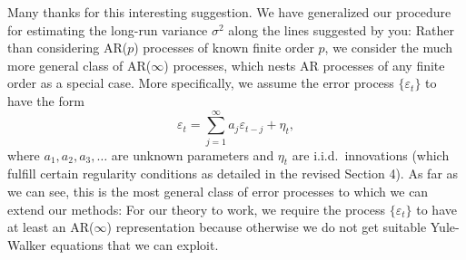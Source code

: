 \documentclass[a4paper,12pt]{article}
\begin{document}
\begin{enumerate}[label=(\arabic*),leftmargin=0.7cm]
Many thanks for this interesting suggestion. We have generalized our procedure for estimating the long-run variance $\sigma^2$ along the lines suggested by you: Rather than considering AR($p$) processes of known finite order $p$, we consider the much more general class of AR($\infty$) processes, which nests AR processes of any finite order as a special case. More specifically, we assume the error process $\{\varepsilon_t\}$ to have the form
\begin{equation}\label{AR-inf}
\varepsilon_t = \sum\limits_{j=1}^\infty a_j \varepsilon_{t-j} + \eta_t, \tag{$*$} 
\end{equation}
where $a_1,a_2,a_3,\ldots$ are unknown parameters and $\eta_t$ are i.i.d.\ innovations (which fulfill certain regularity conditions as detailed in the revised Section 4). As far as we can see, this is the most general class of error processes to which we can extend our methods: For our theory to work, we require the process $\{\varepsilon_t\}$ to have at least an AR($\infty$) representation because otherwise we do not get suitable Yule-Walker equations that we can exploit. 


\end{enumerate}
\end{document}
